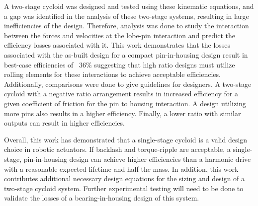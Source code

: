 A two-stage cycloid was designed and tested using these kinematic equations, and a gap was identified in the analysis of these two-stage systems, resulting in large inefficiencies of the design. Therefore, analysis was done to study the interaction between the forces and velocities at the lobe-pin interaction and predict the efficiency losses associated with it. This work demonstrates that the losses associated with the as-built design for a compact pin-in-housing design result in best-case efficiencies of ~36\% suggesting that high ratio designs must utilize rolling elements for these interactions to achieve acceptable efficiencies. Additionally, comparisons were done to give guidelines for designers. A two-stage cycloid with a negative ratio arrangement results in increased efficiency for a given coefficient of friction for the pin to housing interaction. A design utilizing more pins also results in a higher efficiency. Finally, a lower ratio with similar outputs can result in higher efficiencies. 

Overall, this work has demonstrated that a single-stage cycloid is a valid design choice in robotic actuators. If backlash and torque-ripple are acceptable, a single-stage, pin-in-housing design can achieve higher efficiencies than a harmonic drive with a reasonable expected lifetime and half the mass. In addition, this work contributes additional necessary design equations for the sizing and design of a two-stage cycloid system. Further experimental testing will need to be done to validate the losses of a bearing-in-housing design of this system. 

